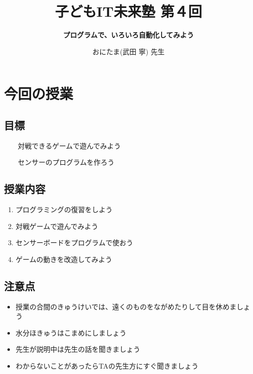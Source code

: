 \documentclass[a4paper,12pt]{jarticle}
\title{\Huge\bf 子どもIT未来塾 第４回}
\author{
\huge\bf プログラムで、いろいろ自動化してみよう
\vspace{15mm}
}
\date{ \Huge おにたま(武田 寧) 先生 }
\begin{document}
\clearpage\setcounter{page}{1}\pagestyle{Standard}
\thispagestyle{FirstPage}

\maketitle

\setcounter{page}{1}\pagestyle{Standard}


\clearpage

\section{今回の授業}
\subsection{目標}
\ \ \ \ 対戦できるゲームで遊んでみよう

\ \ \ \ センサーのプログラムを作ろう

\subsection{授業内容}
\begin{enumerate}
\item プログラミングの復習をしよう
\item 対戦ゲームで遊んでみよう
\item センサーボードをプログラムで使おう
\item ゲームの動きを改造してみよう
\end{enumerate}
\subsection{注意点}
\begin{itemize}
\item
授業の合間のきゅうけいでは、遠くのものをながめたりして目を休めましょう
\item 水分ほきゅうはこまめにしましょう
\item
先生が説明中は先生の話を聞きましょう
\item
わからないことがあったらTAの先生方にすぐ聞きましょう
\end{itemize}
\end{document}
